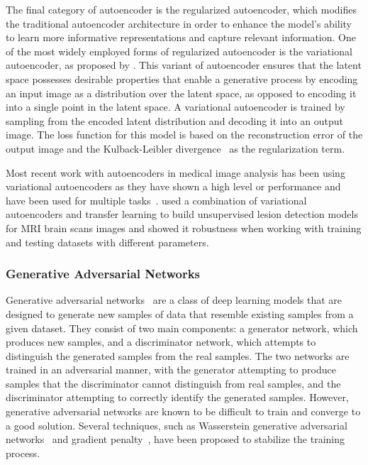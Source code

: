The final category of autoencoder is the regularized autoencoder, which modifies the traditional autoencoder architecture in order to enhance the model's ability to learn more informative representations and capture relevant information. One of the most widely employed forms of regularized autoencoder is the variational autoencoder, as proposed by \cite{kingma2013auto}. This variant of autoencoder ensures that the latent space possesses desirable properties that enable a generative process by encoding an input image as a distribution over the latent space, as opposed to encoding it into a single point in the latent space. A variational autoencoder is trained by sampling from the encoded latent distribution and decoding it into an output image. The loss function for this model is based on the reconstruction error of the output image and the Kulback-Leibler divergence~\citep{kullback1951information} as the regularization term.

Most recent work with autoencoders in medical image analysis has been using variational autoencoders as they have shown a high level or performance and have been used for multiple tasks~\citep{wei2020recent}. \cite{akrami2020brain} used a combination of variational autoencoders and transfer learning to build unsupervised lesion detection models for MRI brain scans images and showed it robustness when working with training and testing datasets with different parameters. \cite{thiagarajan2020improving}

\subsubsection{Generative Adversarial Networks}
\label{subsubsec:generative_adversarial_networks}
Generative adversarial networks~\citep{goodfellow2014advances} are a class of deep learning models that are designed to generate new samples of data that resemble existing samples from a given dataset. They consist of two main components: a generator network, which produces new samples, and a discriminator network, which attempts to distinguish the generated samples from the real samples. The two networks are trained in an adversarial manner, with the generator attempting to produce samples that the discriminator cannot distinguish from real samples, and the discriminator attempting to correctly identify the generated samples. However, generative adversarial networks are known to be difficult to train and converge to a good solution. Several techniques, such as Wasserstein generative adversarial networks~\citep{arjovsky2017wasserstein} and gradient penalty~\citep{gulrajani2017improved}, have been proposed to stabilize the training process.

